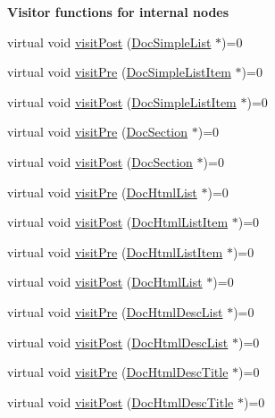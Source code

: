 \begin{Indent}{\bf Visitor functions for internal nodes}
\begin{DoxyCompactItemize}
\item 
virtual void \hyperlink{class_doc_visitor_a01330622b0795145dc662c2c32965e7d}{visit\+Post} (\hyperlink{class_doc_simple_list}{Doc\+Simple\+List} $\ast$)=0
\item 
virtual void \hyperlink{class_doc_visitor_ae23ed0ebf60d58c7d7821083ad4fc283}{visit\+Pre} (\hyperlink{class_doc_simple_list_item}{Doc\+Simple\+List\+Item} $\ast$)=0
\item 
virtual void \hyperlink{class_doc_visitor_a59ee419b5f54332cb88dca97e78d1fea}{visit\+Post} (\hyperlink{class_doc_simple_list_item}{Doc\+Simple\+List\+Item} $\ast$)=0
\item 
virtual void \hyperlink{class_doc_visitor_a78190d964b165c0f8589ed1a6faa989a}{visit\+Pre} (\hyperlink{class_doc_section}{Doc\+Section} $\ast$)=0
\item 
virtual void \hyperlink{class_doc_visitor_a083957bd79581ce312e7e3ad9e3f6102}{visit\+Post} (\hyperlink{class_doc_section}{Doc\+Section} $\ast$)=0
\item 
virtual void \hyperlink{class_doc_visitor_a4bca6fe6f64ea99abafd6b5ab60da885}{visit\+Pre} (\hyperlink{class_doc_html_list}{Doc\+Html\+List} $\ast$)=0
\item 
virtual void \hyperlink{class_doc_visitor_a213f7b6711dcde03c51487eabd229c43}{visit\+Post} (\hyperlink{class_doc_html_list_item}{Doc\+Html\+List\+Item} $\ast$)=0
\item 
virtual void \hyperlink{class_doc_visitor_af2a2b89f574d5c25112e050338886255}{visit\+Pre} (\hyperlink{class_doc_html_list_item}{Doc\+Html\+List\+Item} $\ast$)=0
\item 
virtual void \hyperlink{class_doc_visitor_a94c4bf557fa59bfa262d4b1fcb064b79}{visit\+Post} (\hyperlink{class_doc_html_list}{Doc\+Html\+List} $\ast$)=0
\item 
virtual void \hyperlink{class_doc_visitor_ad342a149c6ce394db59da0436e051d9b}{visit\+Pre} (\hyperlink{class_doc_html_desc_list}{Doc\+Html\+Desc\+List} $\ast$)=0
\item 
virtual void \hyperlink{class_doc_visitor_a32e4c8689a7e005bdb882c3a167767c3}{visit\+Post} (\hyperlink{class_doc_html_desc_list}{Doc\+Html\+Desc\+List} $\ast$)=0
\item 
virtual void \hyperlink{class_doc_visitor_a7807d986121da267abcd3b4bf334fe57}{visit\+Pre} (\hyperlink{class_doc_html_desc_title}{Doc\+Html\+Desc\+Title} $\ast$)=0
\item 
virtual void \hyperlink{class_doc_visitor_aea00af70d99f90581cb07c126a819688}{visit\+Post} (\hyperlink{class_doc_html_desc_title}{Doc\+Html\+Desc\+Title} $\ast$)=0

\end{DoxyCompactItemize}
\end{Indent}
